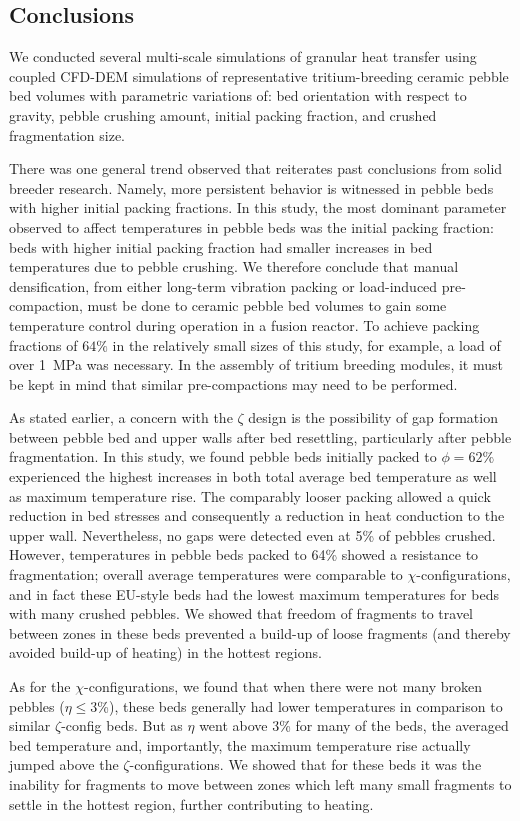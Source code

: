 \subsection{Conclusions}
We conducted several multi-scale simulations of granular heat transfer using coupled CFD-DEM simulations of representative tritium-breeding ceramic pebble bed volumes with parametric variations of: bed orientation with respect to gravity, pebble crushing amount, initial packing fraction, and crushed fragmentation size.

There was one general trend observed that reiterates past conclusions from solid breeder research. Namely, more persistent behavior is witnessed in pebble beds with higher initial packing fractions. In this study, the most dominant parameter observed to affect temperatures in pebble beds was the initial packing fraction: beds with higher initial packing fraction had smaller increases in bed temperatures due to pebble crushing. We therefore conclude that manual densification, from either long-term vibration packing or load-induced pre-compaction, must be done to ceramic pebble bed volumes to gain some temperature control during operation in a fusion reactor. To achieve packing fractions of $64\%$ in the relatively small sizes of this study, for example, a load of over \SI{1}{\mega\pascal} was necessary. In the assembly of tritium breeding modules, it must be kept in mind that similar pre-compactions may need to be performed.

As stated earlier, a concern with the $\zeta$ design is the possibility of gap formation between pebble bed and upper walls after bed resettling, particularly after pebble fragmentation. In this study, we found pebble beds initially packed to $\phi = 62\%$ experienced the highest increases in both total average bed temperature as well as maximum temperature rise. The comparably looser packing allowed a quick reduction in bed stresses and consequently a reduction in heat conduction to the upper wall. Nevertheless, no gaps were detected even at 5\% of pebbles crushed. However, temperatures in pebble beds packed to 64\% showed a resistance to fragmentation; overall average temperatures were comparable to $\chi$-configurations, and in fact these EU-style beds had the lowest maximum temperatures for beds with many crushed pebbles. We showed that freedom of fragments to travel between zones in these beds prevented a build-up of loose fragments (and thereby avoided build-up of heating) in the hottest regions.

As for the $\chi$-configurations, we found that when there were not many broken pebbles ($\eta \le 3$\%), these beds generally had lower temperatures in comparison to similar $\zeta$-config beds. But as $\eta$ went above 3\% for many of the beds, the averaged bed temperature and, importantly, the maximum temperature rise actually jumped above the $\zeta$-configurations. We showed that for these beds it was the inability for fragments to move between zones which left many small fragments to settle in the hottest region, further contributing to heating.

